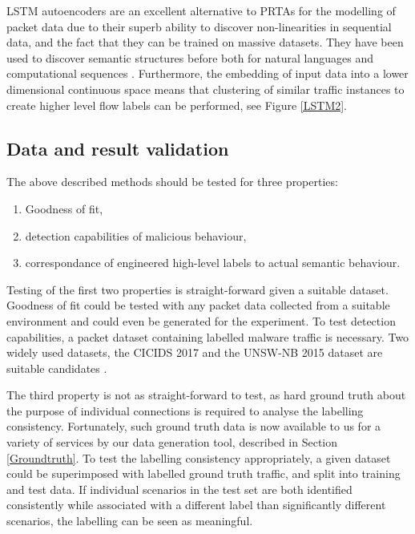 \documentclass[a4paper,12pt,twoside]{report}
\begin{document}
LSTM autoencoders are an excellent alternative to PRTAs for the modelling of packet data due to their superb ability to discover non-linearities in sequential data, and the fact that they can be trained on massive datasets. They have been used to discover semantic structures before both for natural languages \cite{yang2017improved, silberer2014learning} and computational sequences \cite{yousefi2017autoencoder}.
 Furthermore, the embedding of input data into a lower dimensional continuous space means that clustering of similar traffic instances to create higher level flow labels can be performed, see Figure \ref{LSTM2}.

\subsection{Data and result validation}\label{Resultsval}

The above described methods should be tested for three properties:

\begin{enumerate}
\item Goodness of fit,
\item detection capabilities of malicious behaviour,
\item correspondance of engineered high-level labels to actual semantic behaviour.
\end{enumerate}

Testing of the first two properties is straight-forward given a suitable dataset. Goodness of fit could be tested with any packet data collected from a suitable environment and could even be generated for the experiment. To test detection capabilities, a packet dataset containing labelled malware traffic  is necessary. Two widely used datasets, the CICIDS 2017 and the UNSW-NB 2015 dataset are suitable candidates \cite{moustafa_unsw-nb15:_2015,sharafaldin2018towards}.

The third property is not as straight-forward to test, as hard ground truth about the purpose of individual connections is required to analyse the labelling consistency. Fortunately, such ground truth data is now available to us for a variety of services by our data generation tool, described in Section \ref{Groundtruth}. To test the labelling consistency appropriately, a given dataset could be superimposed with labelled ground truth traffic, and split into training and test data. If individual scenarios in the test set are both identified consistently  while associated with a different label than significantly different scenarios, the labelling can be seen as meaningful.  
\end{document}
